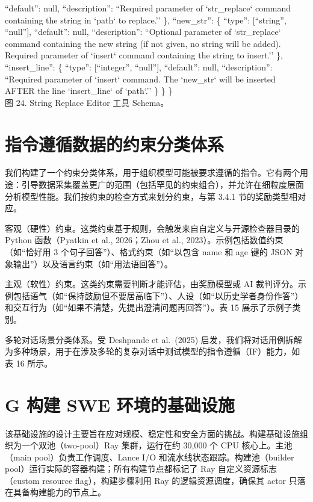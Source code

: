 \documentclass[
  10
]{article}
\begin{document}
``default'': null, ``description'': ``Required parameter of
`str\_replace` command containing the string in `path` to replace.'' \},
``new\_str'': \{ ``type'': {[}``string'', ``null''{]}, ``default'':
null, ``description'': ``Optional parameter of `str\_replace` command
containing the new string (if not given, no string will be added).
Required parameter of `insert` command containing the string to
insert.'' \}, ``insert\_line'': \{ ``type'': {[}``integer'',
``null''{]}, ``default'': null, ``description'': ``Required parameter of
`insert` command. The `new\_str` will be inserted AFTER the line
`insert\_line` of `path`.'' \} \} \}\\
图 24. String Replace Editor 工具 Schema。



\section{指令遵循数据的约束分类体系}\label{f-constraint-taxonomy-for-instruction-following-data}

我们构建了一个约束分类体系，用于组织模型可能被要求遵循的指令。它有两个用途：引导数据采集覆盖更广的范围（包括罕见的约束组合），并允许在细粒度层面分析模型性能。我们按约束的检查方式来划分约束，与第 3.4.1 节的奖励类型相对应。

客观（硬性）约束。这类约束基于规则，会触发来自自定义与开源检查器目录的 Python 函数（Pyatkin et al., 2026；Zhou et al., 2023）。示例包括数值约束（如``恰好用 3 个句子回答''）、格式约束（如``以包含 name 和 age 键的 JSON 对象输出''）以及语言约束（如``用法语回答''）。

主观（软性）约束。这类约束需要判断才能评估，由奖励模型或 AI 裁判评分。示例包括语气（如``保持鼓励但不要居高临下''）、人设（如``以历史学者身份作答''）和交互行为（如``如果不清楚，先提出澄清问题再回答''）。表 15 展示了示例子类别。

多轮对话场景分类体系。受 Deshpande et al.~(2025) 启发，我们将对话用例拆解为多种场景，用于在涉及多轮的复杂对话中测试模型的指令遵循（IF）能力，如表 16 所示。

\section{G 构建 SWE 环境的基础设施}\label{g-infrastructure-for-building-swe-environments}

该基础设施的设计主要旨在应对规模、稳定性和安全方面的挑战。构建基础设施组织为一个双池（two-pool）Ray 集群，运行在约 30,000 个 CPU 核心上。主池（main pool）负责工作调度、Lance I/O 和流水线状态跟踪。构建池（builder pool）运行实际的容器构建；所有构建节点都标记了 Ray 自定义资源标志（custom resource flag），构建步骤利用 Ray 的逻辑资源调度，确保其 actor 只落在具备构建能力的节点上。
\end{document}
